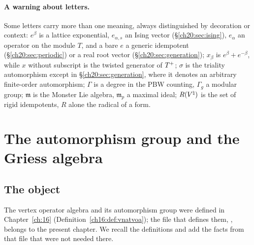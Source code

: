 \paragraph{A warning about letters.}  Some letters carry more than one meaning, always distinguished by decoration or
context: $e^\beta$ is a lattice exponential, $e_{\alpha,s}$ an Ising vector (\S\ref{ch20:sec:ising}), $e_\alpha$ an operator on
the module $T$, and a bare $e$ a generic idempotent (\S\ref{ch20:sec:periodic}) or a real root vector
(\S\ref{ch20:sec:generation}); $x_\beta$ is $e^\beta+e^{-\beta}$, while $x$ without subscript is the twisted generator of
$T^{+}$; $\sigma$ is the triality automorphism except in \S\ref{ch20:sec:generation}, where it denotes an arbitrary
finite-order automorphism; $\Gamma$ is a degree in the PBW counting, $\Gamma_g$ a modular group; $\mathfrak m$ is the Monster
Lie algebra, $\mathfrak m_p$ a maximal ideal; $R({V^{\natural}})$ is the set of rigid idempotents, $R$ alone the radical of a form.

\section{The automorphism group and the Griess algebra}\label{ch20:sec:aut}

\subsection{The object}

The vertex operator algebra  and its automorphism group  were defined in
Chapter~\ref{ch:16} (Definition~\ref{ch16:def:vnatvoa}); the file that defines them,
, belongs to the present chapter.  We recall the definitions and add the facts
from that file that were not needed there.

